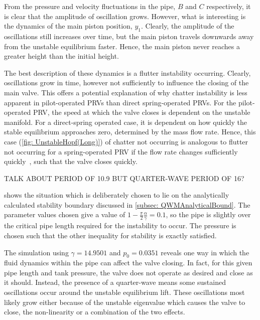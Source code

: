 From the pressure and velocity fluctuations in the pipe, $B$ and $C$ respectively, it is clear that the amplitude of oscillation grows. However, what is interesting is the dynamics of the main piston position, $y_1$. Clearly, the amplitude of the oscillations still increases over time, but the main piston travels downwards away from the unstable equilibrium faster. Hence, the main piston never reaches a greater height than the initial height.

The best description of these dynamics is a flutter instability occurring. Clearly, oscillations grow in time, however not sufficiently to influence the closing of the main valve. This offers a potential explanation of why chatter instability is less apparent in pilot-operated PRVs than direct spring-operated PRVs.
For the pilot-operated PRV, the speed at which the valve closes is dependent on the unstable manifold. For a direct-spring operated case, it is dependent on how quickly the stable equilibrium approaches zero, determined by the mass flow rate.
Hence, this case (\cref{fig: UnstableHopf(Long)}) of chatter not occurring is analogous to flutter not occurring for a spring-operated PRV if the flow rate changes sufficiently quickly~\cite{Hos2017DynamicRecommendations}, such that the valve closes quickly.

TALK ABOUT PERIOD OF 10.9 BUT QUARTER-WAVE PERIOD OF 16?

 shows the situation which is deliberately chosen to lie on the analytically calculated stability boundary discussed in \cref{subsec: QWMAnalyticalBound}. The parameter values chosen give a value of $1 - \frac{\pi}{2} \frac{\alpha}{\gamma} = 0.1$, so the pipe is slightly over the critical pipe length required for the instability to occur. The pressure is chosen such that the other inequality for stability is exactly satisfied.
~


The simulation using $\gamma = 14.9501$ and $p_0 = 0.0351$ reveals one way in which the fluid dynamics within the pipe can affect the valve closing. In fact, for this given pipe length and tank pressure, the valve does not operate as desired and close as it should. Instead, the presence of a quarter-wave means some sustained oscillations occur around the unstable equilibrium lift. These oscillations most likely grow either because of the unstable eigenvalue which causes the valve to close, the non-linearity or a combination of the two effects.

